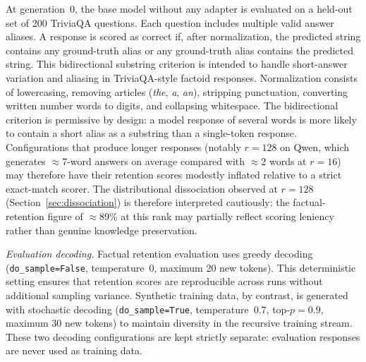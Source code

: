 \documentclass[a4paper,fleqn]{cas-dc}
\newif\ifshowchanges
\newcommand{\rev}[1]{\ifshowchanges{\color{blue}#1}\else{#1}\fi}
\begin{document}
At generation~0, the base model without any adapter is evaluated on a held-out
set of 200 TriviaQA questions. Each question includes multiple valid answer
aliases. A response is scored as correct if, after normalization, the predicted
string contains any ground-truth alias or any ground-truth alias contains the
predicted string. This bidirectional substring criterion is intended to handle
short-answer variation and aliasing in TriviaQA-style factoid responses.
Normalization consists of lowercasing, removing articles
(\textit{the}, \textit{a}, \textit{an}), stripping punctuation, converting
written number words to digits, and collapsing whitespace.
The bidirectional criterion is permissive by design: a model response of several
words is more likely to contain a short alias as a substring than a
single-token response. Configurations that produce longer responses
(notably $r=128$ on Qwen, which generates $\approx$7-word answers on average
compared with $\approx$2 words at $r=16$) may therefore have their retention
scores modestly inflated relative to a strict exact-match scorer. The
distributional dissociation observed at $r=128$ (Section~\ref{sec:dissociation})
is therefore interpreted cautiously: the factual-retention figure of $\approx$89\%
at this rank may partially reflect scoring leniency rather than genuine
knowledge preservation. %

\textit{Evaluation decoding.} Factual retention evaluation uses greedy
decoding (\rev{\texttt{do\_sample=False},} temperature~0, maximum 20 new tokens). This deterministic setting
ensures that retention scores are reproducible across runs without additional
sampling variance. Synthetic training data, by contrast, is generated with
stochastic decoding (\rev{\texttt{do\_sample=True},} temperature~0.7, top-$p=0.9$, maximum 30 new tokens) to
maintain diversity in the recursive training stream. These two decoding
configurations are kept strictly separate: evaluation responses are never used
as training data.
\end{document}
